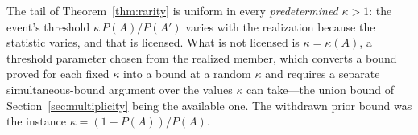 \begin{lemma}\label{lem:fixed}
The tail of Theorem~\ref{thm:rarity} is uniform in every \emph{predetermined} $\kappa > 1$: the event's threshold $\kappa\,P(A)/P(A')$ varies with the realization because the statistic varies, and that is licensed. What is not licensed is $\kappa = \kappa(A)$, a threshold parameter chosen from the realized member, which converts a bound proved for each fixed $\kappa$ into a bound at a random $\kappa$ and requires a separate simultaneous-bound argument over the values $\kappa$ can take---the union bound of Section~\ref{sec:multiplicity} being the available one. The withdrawn prior bound was the instance $\kappa = (1-P(A))/P(A)$.
\end{lemma}

